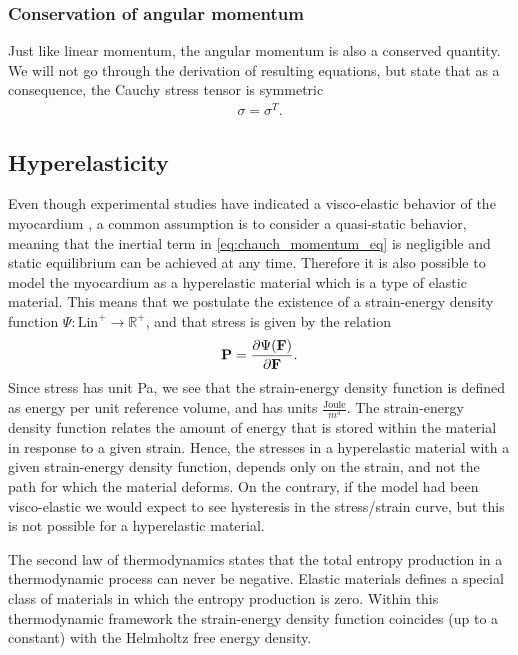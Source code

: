 \subsubsection{Conservation of angular momentum}
Just like linear momentum, the angular momentum is also a conserved
quantity. We will not go through the derivation of resulting
equations, but state that as a consequence, the Cauchy stress tensor is
symmetric
\begin{align}
  \sigma = \sigma^T.
\end{align}



\subsection{Hyperelasticity}
\label{sec:hyperelasticity}

Even though experimental studies have indicated a visco-elastic behavior
of the myocardium \cite{dokos2002shear, gultekin2016orthotropic}, a
common assumption is to consider a quasi-static behavior, meaning that
the inertial term in \eqref{eq:chauch_momentum_eq} is negligible and
static equilibrium can be achieved at any time. Therefore
it is also possible to model the myocardium as a hyperelastic material
which is a type of elastic material.
This means that we postulate the existence of
a strain-energy density function $\Psi:\mathrm{Lin}^+ \rightarrow
\mathbb{R}^+$, and that stress is given by the relation
\begin{align}
\mathbf{P} = \frac{\partial \Psi(\mathbf{F})}{\partial \mathbf{F}}.
\end{align}
Since stress has unit Pa, we see that the strain-energy density
function is defined as energy per unit reference volume, and has units
$\frac{\text{Joule}}{m^3}$. 
The strain-energy density function relates  the amount of
energy that is stored within the material in response to a given
strain. Hence, the stresses in a hyperelastic material with a given
strain-energy density function, depends only on the strain, and not the
path for which the material deforms. On the contrary, if the model had
been visco-elastic we would expect to see hysteresis in the
stress/strain curve, but this is not possible for a hyperelastic
material. 

\begin{remark}
  The second law of thermodynamics states that the total entropy
  production in a thermodynamic process can never be negative. Elastic
  materials defines a special class of materials in which the entropy
  production is zero. Within this thermodynamic framework the
  strain-energy density function coincides (up to a constant) with the
  Helmholtz free energy density.
\end{remark}


